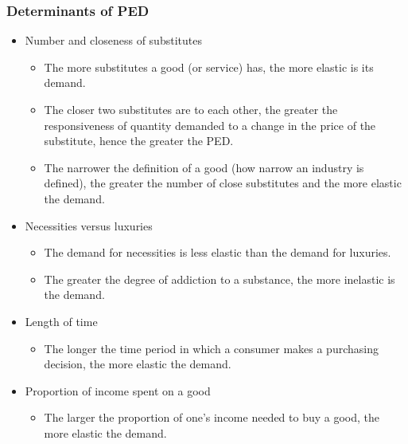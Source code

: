 \documentclass[a4paper,12pt]{article}
\begin{document}
\subsubsection*{Determinants of PED}
\begin{itemize}
  \item Number and closeness of substitutes
  \begin{itemize}
    \item The more substitutes a good (or service) has, the more elastic is its demand.
    \item The closer two substitutes are to each other, the greater the responsiveness of quantity demanded to a change in the price of the substitute, hence the greater the PED.
    \item The narrower the definition of a good (how narrow an industry is defined), the greater the number of close substitutes and the more elastic the demand.
  \end{itemize}
  \item Necessities versus luxuries
  \begin{itemize}
    \item The demand for necessities is less elastic than the demand for luxuries.
    \item The greater the degree of addiction to a substance, the more inelastic is the demand. 
  \end{itemize}
  \item Length of time
  \begin{itemize}
    \item The longer the time period in which a consumer makes a purchasing decision, the more elastic the demand.
  \end{itemize}
  \item Proportion of income spent on a good
  \begin{itemize}
    \item The larger the proportion of one's income needed to buy a good, the more elastic the demand.
  \end{itemize}
\end{itemize}
\end{document}
